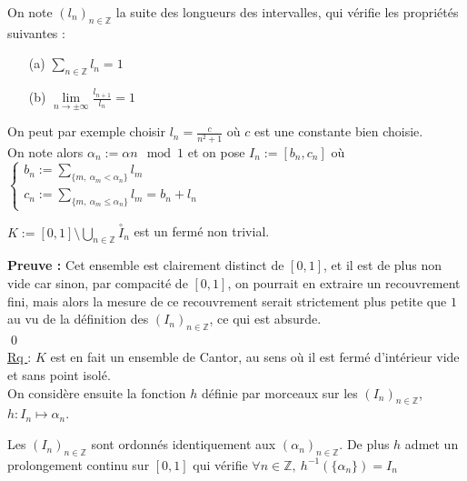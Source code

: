\documentclass[11pt,a4paper]{article}
\begin{document}
On note $(l_n)_{n\in \mathbb{Z}}$ la suite des longueurs des intervalles,  qui vérifie les propriétés suivantes : 
\begin{enumerate}

\item[(a)] $\displaystyle \sum_{n\in \mathbb{Z}} l_n = 1$ 

\item[(b)]$\displaystyle \lim\limits_{n \to \pm \infty } \frac{l_{n+1}}{l_n} = 1 $

\end{enumerate} On peut par exemple choisir $l_n = \displaystyle \frac{c}{n^2 + 1}$ où $c$ est une constante bien choisie. \\
On note alors $ \alpha_n := \alpha n \mod 1$ et on pose $I_n := [b_n , c_n]$ où $\begin{cases} b_n := \displaystyle \sum_{\{m, \ \alpha_m < \alpha_n\}} l_m \\ c_n := \displaystyle \sum_{\{m, \ \alpha_m \leq \alpha_n\}} l_m  = b_n + l_n \end{cases}$ \\

\label{lem:cantor}
\begin{lemma} $\displaystyle K := [0,1] \setminus \bigcup_{n\in \mathbb{Z}} \overset{\circ}I_n$ est un fermé non trivial.
\end{lemma}


\textbf{Preuve :} Cet ensemble est clairement distinct de $[0,1]$, et il est de plus non vide car sinon, par compacité de $[0,1]$, on pourrait en extraire un recouvrement fini, mais alors la mesure de ce recouvrement serait strictement plus petite que $1$ au vu de la définition des $(I_n)_{n\in\mathbb{Z}}$, ce qui est absurde. \\ \qed  ~\\


\underline{Rq }: $K$ est en fait un ensemble de Cantor, au sens où il est fermé d'intérieur vide et sans point isolé. \\

On considère ensuite la fonction $h$ définie par morceaux sur les $(I_n)_{n\in\mathbb{Z}}$, $h : I_n \mapsto \alpha_n$. 
\\

\begin{lemma} Les $(I_n)_{n\in\mathbb{Z}}$ sont ordonnés identiquement aux $(\alpha_n)_{n\in\mathbb{Z}}$. De plus $h$ admet un prolongement continu sur $[0,1]$ qui vérifie $\forall n \in \mathbb{Z},\  h^{-1}(\{\alpha_n\})=I_n$
\end{lemma}
\end{document}
